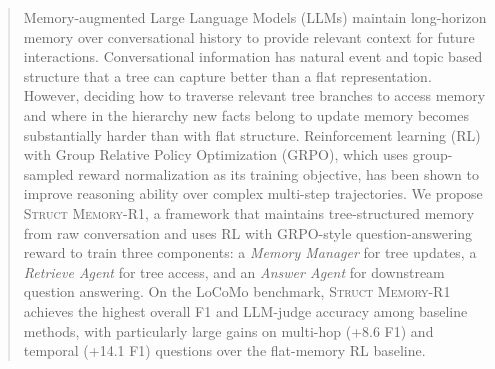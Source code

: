\begin{abstract}
Memory-augmented Large Language Models (LLMs) maintain long-horizon memory over conversational history to provide relevant context for future interactions. Conversational information has natural event and topic based structure that a tree can capture better than a flat representation. However, deciding how to traverse relevant tree branches to access memory and where in the hierarchy new facts belong to update memory becomes substantially harder than with flat structure. Reinforcement learning (RL) with Group Relative Policy Optimization (GRPO), which uses group-sampled reward normalization as its training objective, has been shown to improve reasoning ability over complex multi-step trajectories. We propose \textsc{Struct Memory-R1}, a framework that maintains tree-structured memory from raw conversation and uses RL with GRPO-style question-answering reward to train three components: a \emph{Memory Manager} for tree updates, a \emph{Retrieve Agent} for tree access, and an \emph{Answer Agent} for downstream question answering. On the LoCoMo benchmark, \textsc{Struct Memory-R1} achieves the highest overall F1 and LLM-judge accuracy among baseline methods, with particularly large gains on multi-hop (+8.6 F1) and temporal (+14.1 F1) questions over the flat-memory RL baseline.
\end{abstract}
